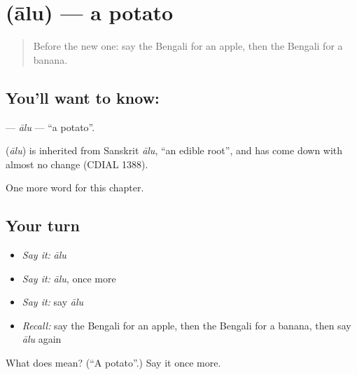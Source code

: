 \section[\texorpdfstring{\bn{আলু} (ālu)}{আলু (ālu)}]{ (ālu) — a potato}

\label{lesson:BN-C56-alu}



\begin{quote}
Before the new one: say the Bengali for an apple, then the Bengali for a banana.
\end{quote}

\subsection*{You'll want to know: }
\textbf{} — \emph{ālu} — \textquotedblleft{}a potato\textquotedblright{}.

\begin{cousinweb}
\textbf{} (\emph{ālu}) is inherited from Sanskrit \emph{ālu}, \textquotedblleft{}an edible root\textquotedblright{}, and has come down with almost no change (CDIAL 1388).
\end{cousinweb}

\begin{grammarlens}[title={What you've built}]
One more word for this chapter.
\end{grammarlens}

\subsection*{Your turn}
\begin{itemize}
\raggedright
  \item \emph{Say it:} \emph{ālu}
  \item \emph{Say it:} \emph{ālu}, once more
  \item \emph{Say it:} say \emph{ālu}
  \item \emph{Recall:} say the Bengali for an apple, then the Bengali for a banana, then say \emph{ālu} again
\end{itemize}

\begin{tcolorbox}[breakable,colback=teal!4,colframe=teal!35!black,title={Before you move on}]
What does  mean? (\textquotedblleft{}A potato\textquotedblright{}.) Say it once more.
\end{tcolorbox}
